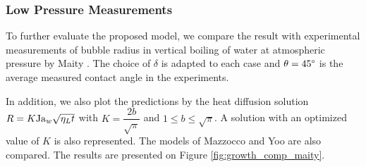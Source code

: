 \subsubsection{Low Pressure Measurements}
To further evaluate the proposed model, we compare the result with experimental measurements of bubble radius in vertical boiling of water at atmospheric pressure by Maity \cite{maity_effect_2000}. The choice of $\delta$ is adapted to each case and $\theta=45\degree$ is the average measured contact angle in the experiments.

In addition, we also plot the predictions by the heat diffusion solution $R=K\mathrm{Ja}_{w}\sqrt{\eta_{L}t}$ with $K=\dfrac{2b}{\sqrt{\pi}}$ and $1 \leq b \leq \sqrt{\pi}$. A solution with an optimized value of $K$ is also represented. The models of Mazzocco and Yoo \etal are also compared. The results are presented on Figure \ref{fig:growth_comp_maity}.

